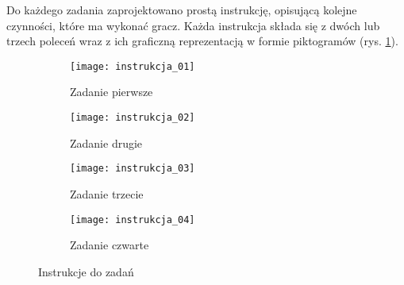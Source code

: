     Do każdego zadania zaprojektowano prostą instrukcję, opisującą kolejne czynności, które ma wykonać gracz.
    Każda instrukcja składa się z dwóch lub trzech poleceń wraz z ich graficzną reprezentacją w formie piktogramów (rys. \ref{fig:instrukcja}).
    
    \begin{figure}
        \centering
        \begin{subfigure}{0.5\linewidth}
            \texttt{[image: instrukcja\_01]}
            \caption{Zadanie pierwsze}
        \end{subfigure}
        \par\bigskip
        \begin{subfigure}{0.5\linewidth}
            \texttt{[image: instrukcja\_02]}
            \caption{Zadanie drugie}
        \end{subfigure}
        \par\bigskip
        \begin{subfigure}{0.75\linewidth}
            \texttt{[image: instrukcja\_03]}
            \caption{Zadanie trzecie}
        \end{subfigure}
        \par\bigskip
        \begin{subfigure}{0.5\linewidth}
            \texttt{[image: instrukcja\_04]}
            \caption{Zadanie czwarte}
        \end{subfigure}
        \caption{Instrukcje do zadań}
        \label{fig:instrukcja}
    \end{figure}
